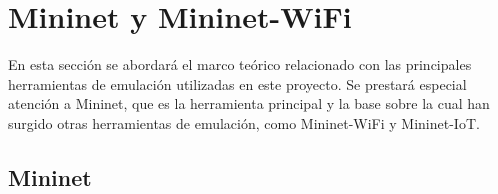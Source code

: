 \section{Mininet y Mininet-WiFi}
\label{sec:mininet}

En esta sección se abordará el marco teórico relacionado con las principales herramientas de emulación utilizadas en este proyecto. Se prestará especial atención a Mininet, que es la herramienta principal y la base sobre la cual han surgido otras herramientas de emulación, como Mininet-WiFi y Mininet-IoT.\\

\subsection{Mininet}


